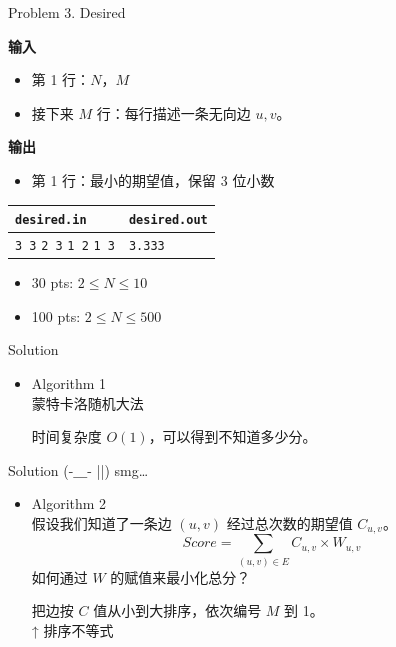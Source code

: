 \documentclass[UTF8]{beamer}
\begin{document}
\begin{frame}{Problem 3. Desired}

\textbf{输入}
\begin{itemize}
    \item 第 1 行：$N$，$M$
    \item 接下来 $M$ 行：每行描述一条无向边 $u, v$。
\end{itemize}
\textbf{输出}
\begin{itemize}
    \item 第 1 行：最小的期望值，保留 3 位小数
\end{itemize}

\begin{tabularx}{\textwidth}{|X|X|}
\hline
\texttt{\textbf{desired.in}} & \texttt{\textbf{desired.out}} \\ \hline
\texttt{3 3}\newline
\texttt{2 3}\newline
\texttt{1 2}\newline
\texttt{1 3}
&
\texttt{3.333}
\\ \hline
\end{tabularx}
\newline
\begin{itemize}
    \item 30 pts: $2 \leq N \leq 10$
    \item 100 pts: $2 \leq N \leq 500$
\end{itemize}

\end{frame}

\begin{frame}{Solution}

\begin{itemize}
    \item Algorithm 1 \\
        蒙特卡洛随机大法

        \pause
        时间复杂度 $O(1)$，可以得到不知道多少分。
\end{itemize}

\end{frame}

\begin{frame}{Solution}
(-＿- ||) smg…

\pause
\begin{itemize}
    \item Algorithm 2 \\
        假设我们知道了一条边 $(u, v)$ 经过总次数的期望值 $C_{u, v}$。
        $$
            Score = \sum_{(u, v) \in E} C_{u, v} \times W_{u, v}
        $$
        \pause
        如何通过 $W$ 的赋值来最小化总分？

        \pause
        把边按 $C$ 值从小到大排序，依次编号 $M$ 到 1。 \\
        ↑ 排序不等式
\end{itemize}

\end{frame}
\end{document}
